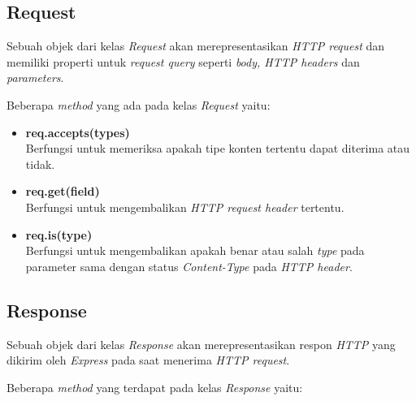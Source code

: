 \subsection{Request}
Sebuah objek dari kelas \textit{Request} akan merepresentasikan \textit{HTTP request} dan memiliki properti untuk \textit{request query} seperti \textit{body, HTTP headers} dan \textit{parameters}.

Beberapa \textit{method} yang ada pada kelas \textit{Request} yaitu: 
\begin{itemize}
	\item \textbf{req.accepts(types)} \\ Berfungsi untuk memeriksa apakah tipe konten tertentu dapat diterima atau tidak.
	
	\item \textbf{req.get(field)} \\ Berfungsi untuk mengembalikan \textit{HTTP request header} tertentu.
	
	\item \textbf{req.is(type)} \\ Berfungsi untuk mengembalikan apakah benar atau salah \textit{type} pada parameter sama dengan status \textit{Content-Type} pada \textit{HTTP header}.
\end{itemize}

\subsection{Response}
Sebuah objek dari kelas \textit{Response} akan merepresentasikan respon \textit{HTTP} yang dikirim oleh \textit{Express} pada saat menerima \textit{HTTP request}.

Beberapa \textit{method} yang terdapat pada kelas \textit{Response} yaitu: 

